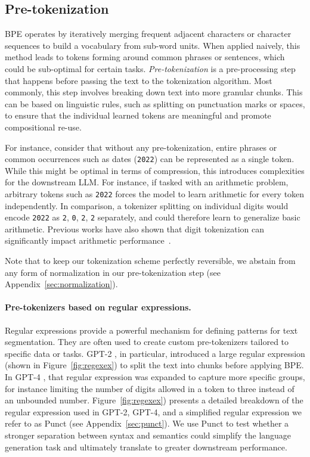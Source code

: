 \subsection{Pre-tokenization}

BPE \cite{sennrich-etal-2016-neural} operates by iteratively merging frequent adjacent characters or character sequences to build a vocabulary from sub-word units. When applied naively, this method leads to tokens forming around common phrases or sentences, which could be sub-optimal for certain tasks.
\textit{Pre-tokenization} is a pre-processing step that happens before passing the text to the tokenization algorithm. Most commonly, this step involves breaking down text into more granular chunks. This can be based on linguistic rules, such as splitting on punctuation marks or spaces, to ensure that the individual learned tokens are meaningful and promote compositional re-use.

For instance, consider that without any pre-tokenization, entire phrases or common occurrences such as dates (\texttt{2022}) can be represented as a single token. While this might be optimal in terms of compression, this introduces complexities for the downstream LLM. For instance, if tasked with an arithmetic problem, arbitrary tokens such as \texttt{2022} forces the model to learn arithmetic for every token independently. In comparison, a tokenizer splitting on individual digits would encode \texttt{2022} as \texttt{2}, \texttt{0}, \texttt{2}, \texttt{2} separately, and could therefore learn to generalize basic arithmetic. Previous works have also shown that digit tokenization can significantly impact arithmetic performance~\citep{nogueira2021investigating,thawani-etal-2021-representing}.

Note that to keep our tokenization scheme perfectly reversible, we abstain from any form of normalization in our pre-tokenization step (see Appendix~\ref{sec:normalization}). 

\paragraph{Pre-tokenizers based on regular expressions.} Regular expressions provide a powerful mechanism for defining patterns for text segmentation. They are often used to create custom pre-tokenizers tailored to specific data or tasks. GPT-2 \cite{gpt2}, in particular, introduced a large regular expression (shown in Figure~\ref{fig:regexex}) to split the text into chunks before applying BPE. In GPT-4 \cite{openai2023gpt4}, that regular expression was expanded to capture more specific groups, for instance limiting the number of digits allowed in a token to three instead of an unbounded number.
Figure~\ref{fig:regexex}) presents a detailed breakdown of the regular expression used in GPT-2, GPT-4, and a simplified regular expression we refer to as Punct (see Appendix~\ref{sec:punct}).
We use Punct to test whether a stronger separation between syntax and semantics could simplify the language generation task and ultimately translate to greater downstream performance.

